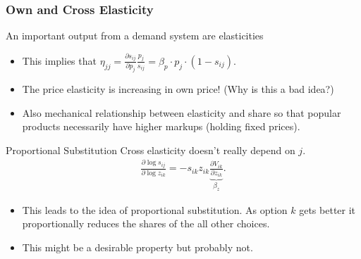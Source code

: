 \documentclass[xcolor=pdftex,dvipsnames,table,mathserif,aspectratio=169]{beamer}
\begin{document}
\begin{frame}
\frametitle{Own and Cross Elasticity}
An important output from a demand system are elasticities
\begin{itemize}
\item This implies that $ \eta_{jj} = \frac{\partial s_{ij}}{\partial p_j} \frac{p_j}{s_{ij}}  = \beta_p \cdot p_j \cdot (1-s_{ij})$.
\item The price elasticity is increasing in own price! (Why is this a bad idea?)
\item Also mechanical relationship between elasticity and \alert{share} so that popular products necessarily have higher markups (holding fixed prices).
\end{itemize}
\end{frame}



\begin{frame}{Proportional Substitution}
Cross elasticity doesn't really depend on $j$.
\begin{eqnarray*}
\frac{ \partial \log s_{ij}}{ \partial \log z_{ik}} = -s_{ik} z_{ik} \underbrace{\frac{\partial V_{ik}}{\partial z_{ik}}}_{\beta_z}.
\end{eqnarray*}
\begin{itemize}
\item This leads to the idea of proportional substitution. As option $k$ gets better it proportionally reduces the shares of the all other choices.
\item This might be a desirable property but probably not.
\end{itemize}
\end{frame}
\end{document}
